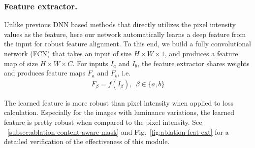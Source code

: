 \documentclass[runningheads]{llncs}
\begin{document}
\subsubsection{Feature extractor.}
Unlike previous DNN based methods that directly utilizes the pixel intensity values as the feature, here our network automatically learns a deep feature from the input for robust feature alignment. To this end, we build a fully convolutional network (FCN) that takes an input of size $H\times W\times 1$, and produces a feature map of size $H\times W \times C$. For inputs $I_a$ and $I_b$, the feature extractor shares weights and produces feature maps $F_a$ and $F_b$, i.e.
\begin{align}
F_\beta = f(I_\beta), ~~\beta \in \{a, b\}
\end{align}

The learned feature is more robust than pixel intensity when applied to loss calculation. Especially for the images with luminance variations, the learned feature is pretty robust when compared to the pixel intensity. See \secname~\ref{subsec:ablation-content-aware-mask} and Fig.~\ref{fig:ablation-feat-ext} for a detailed verification of the effectiveness of this module. 
\end{document}

